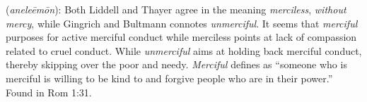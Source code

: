 \item[Unmerciful,]

(\textit{aneleēmōn}):
Both Liddell and Thayer agree in the meaning \emph{merciless}, \emph{without mercy}, while Gingrich and Bultmann connotes \emph{unmerciful}. It seems that \emph{merciful} purposes for active merciful conduct while merciless points at lack of compassion related to cruel conduct. While \emph{unmerciful} aims at holding back merciful conduct, thereby skipping over the poor and needy. \emph{Merciful} defines as ``someone who is merciful is willing to be kind to and forgive people who are in their power.''
Found in Rom 1:31.
